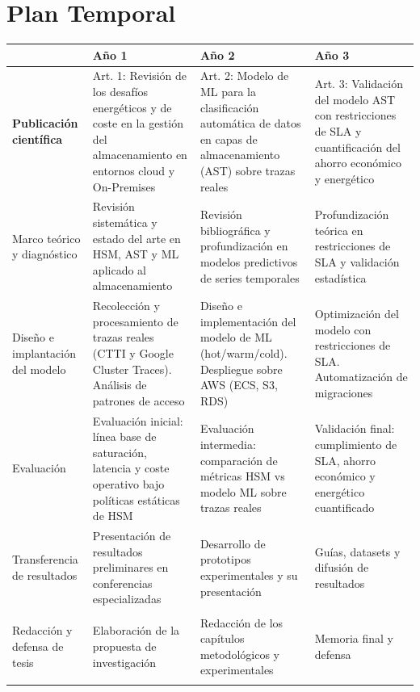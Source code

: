 \section{Plan Temporal}



\noindent
\begin{tabularx}{\textwidth}{|>{\centering\arraybackslash\bfseries\color{azulTexto}}m{3.5cm}|L|L|L|}
    \hline
    \rule{0pt}{15pt} & \textbf{\color{azulTexto}Año 1} & \textbf{\color{azulTexto}Año 2} & \textbf{\color{azulTexto}Año 3} \\ \hline \hline
    
     Publicación científica & Art. 1: Revisión de los desafíos energéticos y de coste en la gestión del almacenamiento en entornos cloud y On-Premises & Art. 2: Modelo de ML para la clasificación automática de datos en capas de almacenamiento (AST) sobre trazas reales & Art. 3: Validación del modelo AST con restricciones de SLA y cuantificación del ahorro económico y energético \\ \hline \hline
    
     Marco teórico y diagnóstico & Revisión sistemática y estado del arte en HSM, AST y ML aplicado al almacenamiento & Revisión bibliográfica y profundización en modelos predictivos de series temporales & Profundización teórica en restricciones de SLA y validación estadística \\ \hline \hline
    
     Diseño e implantación del modelo & Recolección y procesamiento de trazas reales (CTTI y Google Cluster Traces). Análisis de patrones de acceso & Diseño e implementación del modelo de ML (hot/warm/cold). Despliegue sobre AWS (ECS, S3, RDS) & Optimización del modelo con restricciones de SLA. Automatización de migraciones \\ \hline \hline
    
     Evaluación & Evaluación inicial: línea base de saturación, latencia y coste operativo bajo políticas estáticas de HSM & Evaluación intermedia: comparación de métricas HSM vs modelo ML sobre trazas reales & Validación final: cumplimiento de SLA, ahorro económico y energético cuantificado \\ \hline \hline
    
     Transferencia de resultados & Presentación de resultados preliminares en conferencias especializadas & Desarrollo de prototipos experimentales y su presentación & Guías, datasets y difusión de resultados \\ \hline \hline
    
     Redacción y defensa de tesis & Elaboración de la propuesta de investigación & Redacción de los capítulos metodológicos y experimentales & Memoria final y defensa \\ \hline
\end{tabularx}